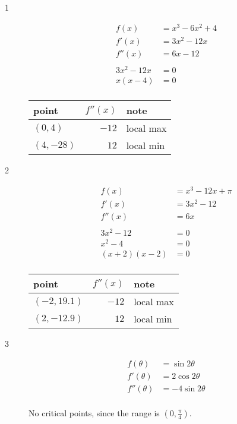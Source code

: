 \documentclass[fleqn]{exam}
\begin{document}
\begin{description}

\item[1]
\begin{align*}
  f(x)   &= x^3 - 6x^2 + 4 \\
  f'(x)  & = 3x^2 - 12x \\  
  f''(x) & = 6x - 12 \\
\\
  3x^2 - 12x &= 0 \\
  x(x - 4) &= 0 \\
\end{align*}

\begin{tabular}{lrl}
\toprule
point      & $f''(x)$ & note \\
\midrule
$(0, 4)$   & $-12$    & local max \\
$(4, -28)$ & $12$     & local min \\
\bottomrule
\end{tabular}

\item[2]
\begin{align*}
  f(x)   &= x^3 - 12x + \pi \\
  f'(x)  & = 3x^2 - 12 \\  
  f''(x) & = 6x \\
\\
  3x^2 - 12 &= 0 \\
  x^2 - 4 &= 0 \\
  (x + 2)(x - 2) &= 0 \\
\end{align*}

\begin{tabular}{lrl}
\toprule
point      & $f''(x)$ & note \\
\midrule
$(-2, 19.1)$   & $-12$    & local max \\
$(2, -12.9)$   & $12$     & local min \\
\bottomrule
\end{tabular}

\pagebreak

\item[3]
\begin{align*}
  f(\theta)   &= \sin 2 \theta \\
  f'(\theta)  &= 2 \cos 2 \theta \\
  f''(\theta) &= -4 \sin 2 \theta \\
\end{align*}

No critical points, since the range is $\left(0, \frac{\pi}{4} \right)$.


\end{description}
\end{document}
